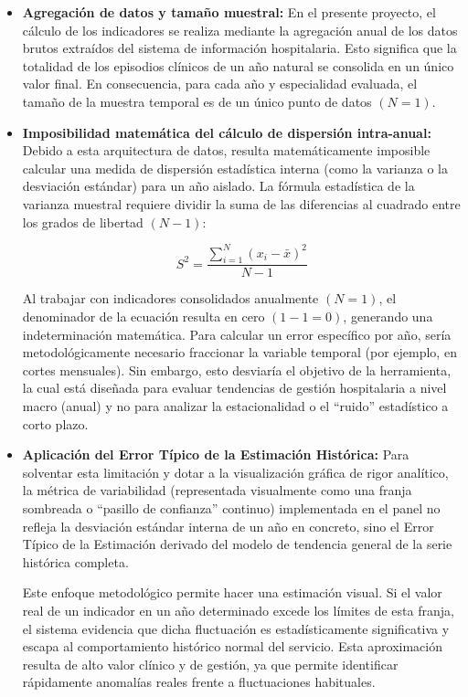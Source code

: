 \begin{itemize}
    \item \textbf{Agregación de datos y tamaño muestral:} En el presente proyecto, el cálculo de los indicadores se realiza mediante la agregación anual de los datos brutos extraídos del sistema de información hospitalaria. Esto significa que la totalidad de los episodios clínicos de un año natural se consolida en un único valor final. En consecuencia, para cada año y especialidad evaluada, el tamaño de la muestra temporal es de un único punto de datos $(N=1)$.

    \item \textbf{Imposibilidad matemática del cálculo de dispersión intra-anual:} Debido a esta arquitectura de datos, resulta matemáticamente imposible calcular una medida de dispersión estadística interna (como la varianza o la desviación estándar) para un año aislado. La fórmula estadística de la varianza muestral requiere dividir la suma de las diferencias al cuadrado entre los grados de libertad $(N-1)$:
    
    \begin{equation}
    S^2 = \frac{\sum_{i=1}^{N} (x_i - \bar{x})^2}{N - 1}
    \end{equation}
    
    Al trabajar con indicadores consolidados anualmente $(N=1)$, el denominador de la ecuación resulta en cero $(1-1=0)$, generando una indeterminación matemática. Para calcular un error específico por año, sería metodológicamente necesario fraccionar la variable temporal (por ejemplo, en cortes mensuales). Sin embargo, esto desviaría el objetivo de la herramienta, la cual está diseñada para evaluar tendencias de gestión hospitalaria a nivel macro (anual) y no para analizar la estacionalidad o el ``ruido'' estadístico a corto plazo.

    \item \textbf{Aplicación del Error Típico de la Estimación Histórica:} Para solventar esta limitación y dotar a la visualización gráfica de rigor analítico, la métrica de variabilidad (representada visualmente como una franja sombreada o ``pasillo de confianza'' continuo) implementada en el panel no refleja la desviación estándar interna de un año en concreto, sino el Error Típico de la Estimación derivado del modelo de tendencia general de la serie histórica completa.
    
    Este enfoque metodológico permite hacer una estimación visual. Si el valor real de un indicador en un año determinado excede los límites de esta franja, el sistema evidencia que dicha fluctuación es estadísticamente significativa y escapa al comportamiento histórico normal del servicio. Esta aproximación resulta de alto valor clínico y de gestión, ya que permite identificar rápidamente anomalías reales frente a fluctuaciones habituales.
\end{itemize}

